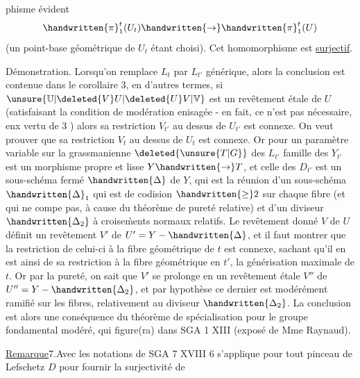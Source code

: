 %
phisme évident
\[
\handwritten{\pi}_1^t(U_t)\handwritten{\rightarrow}\handwritten{\pi}_1^t(U)
\]
(un point-base géométrique de $U_t$ étant choisi). Cet homomorphisme est \uline{surjectif}.

Démonstration. Lorsqu'on remplace $L_t$ par $L_{t'}$ générique, alors la conclusion est contenue dans le corollaire 3, en d'autres termes, si $\unsure{\mathbb{U}|\deleted{V}U|\deleted{U}V|\mathbb{V}}$ est un revêtement étale  de $U$  (satisfaisant la condition de modération enisagée - en fait, ce n'est pas nécessaire, enx vertu de 3 ) alors sa restriction $V_{t'}$ au dessus de $U_{t'}$ est connexe. On veut prouver que sa restriction $V_t$ au dessus de $U_t$ est  connexe. Or pour un paramètre variable sur  la grassmanienne $\deleted{\unsure{T|G}}$ des $L_{t'}$\handwritten{,}   famille des $Y_{t'}$ est un morphisme propre et lisse $Y\handwritten{\rightarrow}T$, et celle des $D_{t'}$ est un sous-schéma fermé  $\handwritten{\Delta}$ de $Y$, qui est la réunion d'un sous-schéma $\handwritten{\Delta}_1$ qui est de codision $\handwritten{\geq}2$ sur chaque fibre (et qui ne compe pas, à cause du théorème de pureté relative) et d'un diviseur $\handwritten{\Delta_2}$ à croise\`{m}ents normaux relatifs. Le revêtement donné $V$ de $U$ définit un revêtement  $V'$ de $U'=Y-\handwritten{\Delta}$, et il faut montrer que la restriction de celui-ci à la fibre géométrique de $t$ est connexe, sachant qu'il en est ainsi de sa restriction à la fibre géométrique en $t'$, la générisation maximale de $t$. Or par la pureté, on sait que $V'$ se prolonge en un revêtement étale $V''$ de $U''=Y-\handwritten{\Delta_2}$, et par hypothèse ce dernier est modérément ramifié sur les fibres, relativement au diviseur $\handwritten{\Delta_2}$. La conclusion est alors une conséquence du théorème  de spécialisation pour le groupe fondamental modéré, qui figure(ra) dans SGA 1 XIII (exposé de Mme Raynaud).

\uline{Remarque}7.Avec les notations de SGA 7 XVIII\handwritten{,} 6 s'applique pour tout pinceau de Lefschetz $D$ pour fournir la surjectivité de
